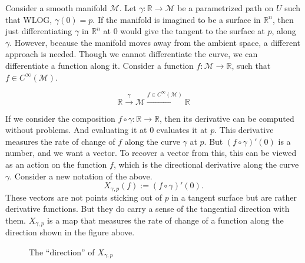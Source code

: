 \documentclass{article}
\theoremstyle{definition}
\theoremstyle{named}
\begin{document}
Consider a smooth manifold $\mathcal{M}$. Let $\gamma: \mathbb{R} \to \mathcal{M}$ be a parametrized path on $U$ such that WLOG, $\gamma(0) = p$. If the manifold is imagined to be a surface in $\mathbb{R}^n$, then just differentiating $\gamma$ in $\mathbb{R}^n$ at $0$ would give the tangent to the surface at $p$, along $\gamma$. However, because the manifold moves away from the ambient space, a different approach is needed. Though we cannot differentiate the curve, we can differentiate a function along it. Consider a function $f: \mathcal{M} \to \mathbb{R}$, such that $f \in C^{\infty}(\mathcal{M})$.

\[
\mathbb{R} \xrightarrow{\gamma}
\mathcal{M}
\xrightarrow{f \in C^{\infty}(\mathcal{M})} \mathbb{R}
\]

If we consider the composition $f \circ \gamma: \mathbb{R} \to \mathbb{R}$, then its derivative can be computed without problems. And evaluating it at $0$ evaluates it at $p$. This derivative measures the rate of change of $f$ along the curve $\gamma$ at $p$. But $(f\circ \gamma)'(0)$ is a number, and we want a vector. To recover a vector from this, this can be viewed as an action on the function $f$, which is the directional derivative along the curve $\gamma$. Consider a new notation of the above.
\[
    X_{\gamma, p}(f) := (f \circ \gamma)'(0).
\]
These vectors are not points sticking out of $p$ in a tangent surface but are rather derivative functions. But they do carry a sense of the tangential direction with them. $X_{\gamma, p}$ is a map that measures the rate of change of a function along the direction shown in the figure above.

\begin{figure}[h]
    \centering
    \caption{The ``direction'' of $X_{\gamma, p}$}
\end{figure}
\end{document}
